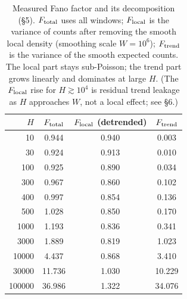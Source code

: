 \documentclass[11pt]{article}
\theoremstyle{definition}
\begin{document}
\begin{table}[t]
\centering\small
\begin{tabular}{rccc}
\toprule
$H$ & $F_{\rm total}$ & $F_{\rm local}$ (detrended) & $F_{\rm trend}$\\
\midrule
10      & 0.944  & 0.940 & 0.003\\
30      & 0.924  & 0.913 & 0.010\\
100     & 0.925  & 0.890 & 0.034\\
300     & 0.967  & 0.860 & 0.102\\
400     & 0.997  & 0.854 & 0.136\\
500     & 1.028  & 0.850 & 0.170\\
1000    & 1.193  & 0.836 & 0.341\\
3000    & 1.889  & 0.819 & 1.023\\
10000   & 4.437  & 0.868 & 3.410\\
30000   & 11.736 & 1.030 & 10.229\\
100000  & 36.986 & 1.322 & 34.076\\
\bottomrule
\end{tabular}
\caption{Measured Fano factor and its decomposition (\S5). $F_{\rm total}$ uses all windows;
$F_{\rm local}$ is the variance of counts after removing the smooth local density (smoothing scale
$W=10^{6}$); $F_{\rm trend}$ is the variance of the smooth expected counts. The local part stays
sub-Poisson; the trend part grows linearly and dominates at large $H$. (The $F_{\rm local}$ rise for
$H\gtrsim10^{4}$ is residual trend leakage as $H$ approaches $W$, not a local effect; see \S6.)}
\label{tab:fano}
\end{table}
\end{document}
